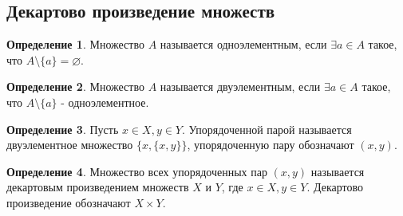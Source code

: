 \documentclass[a4paper, 12pt]{article}
\renewcommand{\emptyset}{\varnothing}
\theoremstyle{definition}
\newtheorem*{definition}{Определение}
\begin{document}
    \subsection{Декартово произведение множеств}
        \begin{definition}
            Множество $A$ называется одноэлементным, если $\exists a\in A$ такое, что $A\setminus\{a\} = \emptyset$.
        \end{definition}
        \begin{definition}
            Множество $A$ называется двуэлементным, если $\exists a\in A$ такое, что $A\setminus\{a\}$ - одноэлементное.
        \end{definition}
        \begin{definition}
            Пусть $x\in X, y\in Y$. Упорядоченной парой называется двуэлементное множество $\{x,\{x,y\}\}$, упорядоченную пару обозначают $(x,y)$.
        \end{definition}
        \begin{definition}
            Множество всех упорядоченных пар $(x,y)$ называется декартовым произведением множеств $X$ и $Y$, где $x\in X, y\in Y$. Декартово произведение обозначают $X\times Y$.
        \end{definition}
\end{document}
